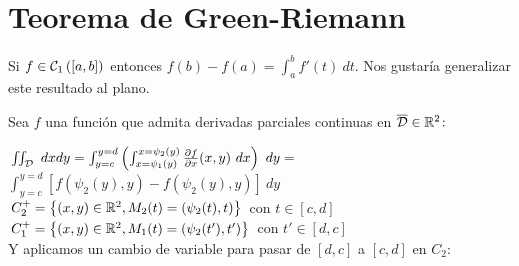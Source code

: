 \documentclass{report}
\begin{document}
\section{Teorema de Green-Riemann}
    \noindent Si $f\in\mathcal{C}_1\left([a,b]\right)$ entonces $f(b)-f(a)=\int_a^b f'(t)\ dt$. Nos gustaría
    generalizar este resultado al plano.\\
    
    \begin{figure}
      \vspace{-1\intextsep}
    \end{figure}

    \noindent Sea $f$ una función que admita derivadas parciales continuas en $\overline{\mathcal{D}}\in\mathbb{R}^2\colon$

    \noindent$\iint_{\mathcal{D}}\ dxdy = \int_{y=c}^{y=d}\left(\int_{x=\psi_1(y)}^{x=\psi_2(y)}\frac{\partial f}{\partial x}(x,y)\ dx\right)\ dy=$
    $\int_{y=c}^{y=d}\left[f\left(\psi_2(y),y\right)-f\left(\psi_2(y),y\right)\right]\ dy$\\

    \noindent$C_2^+ = \left\{(x,y)\in\mathbb{R}^2,M_2(t)=\left(\psi_2(t),t\right)\right\}$ con $t\in[c,d]$\\
    $C_1^+ = \left\{(x,y)\in\mathbb{R}^2,M_1(t)=\left(\psi_2(t'),t'\right)\right\}$ con $t'\in[d,c]$\\
    
    \noindent Y aplicamos un cambio de variable para pasar de $[d,c]$ a $[c,d]$ en $C_2\colon$\\
\end{document}
